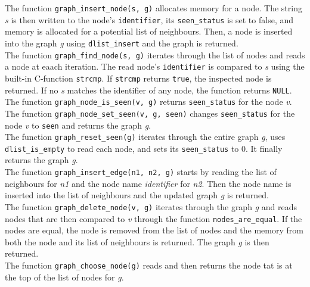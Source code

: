 \documentclass{article}
\begin{document}
\noindent
The function \texttt{graph\_insert\_node(s, g)} allocates memory for a node. The string \textit{s} is then written to the node's \texttt{identifier}, its \texttt{seen\_status} is set to false, and memory is allocated for a potential list of neighbours. Then, a node is inserted into the graph \textit{g} using \texttt{dlist\_insert} and the graph is returned. \\

\noindent
The function \texttt{graph\_find\_node(s, g)} iterates through the list of nodes and reads a node at eaach iteration. The read node's  \texttt{identifier} is compared to \textit{s} using the built-in C-function \texttt{strcmp}. If \texttt{strcmp} returns \texttt{true}, the inspected node is returned. If no \textit{s} matches the identifier of any node, the function returns \texttt{NULL}.\\

\noindent
The function \texttt{graph\_node\_is\_seen(v, g)} returns \texttt{seen\_status} for the node \textit{v}. \\

\noindent
The function \texttt{graph\_node\_set\_seen(v, g, seen)} changes \texttt{seen\_status} for the node \textit{v} to \texttt{seen} and returns the graph \textit{g}. \\

\noindent
The function \texttt{graph\_reset\_seen(g)} iterates through the entire graph \textit{g}, uses \texttt{dlist\_is\_empty} to read each node, and sets its \texttt{seen\_status} to 0. It finally returns the graph \textit{g}. \\

\noindent
The function \texttt{graph\_insert\_edge(n1, n2, g)} starts by reading the list of neighbours for \textit{n1} and the node name \textit{identifier} for \textit{n2}. Then the node name is inserted into the list of neighbours and the updated graph \textit{g} is returned. \\

\noindent
The function \texttt{graph\_delete\_node(v, g)} iterates through the graph \textit{g} and reads nodes that are then compared to \textit{v} through the function \texttt{nodes\_are\_equal}. If the nodes are equal, the node is removed from the list of nodes and the memory from both the node and its list of neighbours is returned. The graph \textit{g} is then returned. \\

\noindent
The function \texttt{graph\_choose\_node(g)} reads and then returns the node tat is at the top of the list of nodes for \textit{g}. \\
\end{document}
